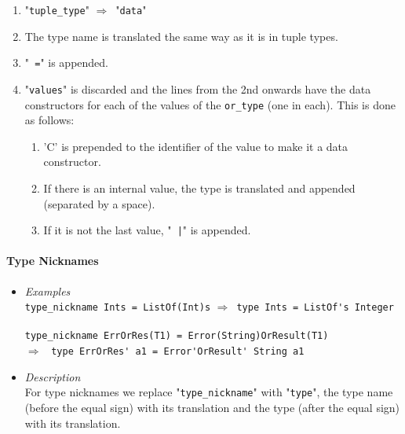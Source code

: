 \documentclass[diploma]{softlab-thesis}
\def\lra{$\Longrightarrow$\ }
\begin{document}
\begin{itemize}
\begin{enumerate}
\item
"\verb|tuple_type|" \lra "\texttt{data}"

\item
The type name is translated the same way as it is in tuple types.

\item
"\texttt{ =}" is appended.

\item
"\texttt{values}" is discarded and the lines from the 2nd onwards have the data
constructors for each of the values of the \verb|or_type| (one in each). This
is done as follows:

\begin{enumerate}

\item
'C' is prepended to the identifier of the value to make it a data constructor.

\item
If there is an internal value, the type is translated and appended (separated
by a space).

\item
If it is not the last value, "\texttt{ |}" is appended.

\end{enumerate}

\end{enumerate}

\end{itemize}

\newpage
\paragraph{Type Nicknames}

\begin{itemize}
\item
\textit{Examples}\\

\verb|type_nickname Ints = ListOf(Int)s| \lra \verb|type Ints = ListOf's Integer|
\\
\\
\verb|type_nickname ErrOrRes(T1) = Error(String)OrResult(T1)|
\\
\lra
\verb|type ErrOrRes' a1 = Error'OrResult' String a1|
\item
\textit{Description}\\

For type nicknames we replace "\verb|type_nickname|" with "\verb|type|",
the type name (before the equal sign) with its translation and the
type (after the equal sign) with its translation.

\end{itemize}
\end{document}
